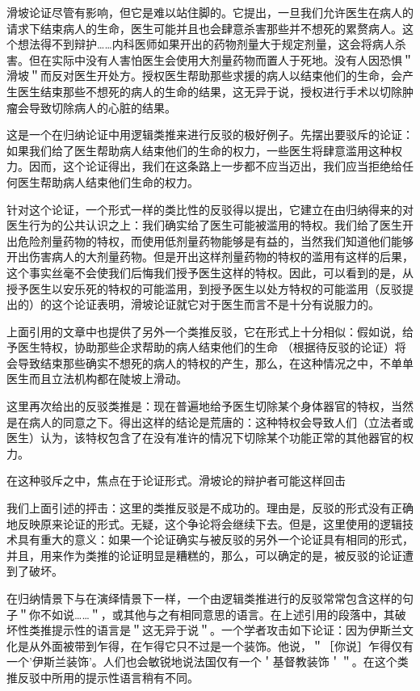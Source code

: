 滑坡论证尽管有影响，但它是难以站住脚的。它提出，一旦我们允许医生在病人的请求下结束病人的生命，医生可能并且也会肆意杀害那些并不想死的累赘病人。这个想法得不到辩护……内科医师如果开出的药物剂量大于规定剂量，这会将病人杀害。但在实际中没有人害怕医生会使用大剂量药物而置人于死地。没有人因恐惧＂滑坡＂而反对医生开处方。授权医生帮助那些求援的病人以结束他们的生命，会产生医生结束那些不想死的病人的生命的结果，这无异于说，授权进行手术以切除肿瘤会导致切除病人的心脏的结果。\cite{rachels1991}

这是一个在归纳论证中用逻辑类推来进行反驳的极好例子。先摆出要驳斥的论证：如果我们给了医生帮助病人结束他们的生命的权力，一些医生将肆意滥用这种权力。因而，这个论证得出，我们在这条路上一步都不应当迈出，我们应当拒绝给任何医生帮助病人结束他们生命的权力。

针对这个论证，一个形式一样的类比性的反驳得以提出，它建立在由归纳得来的对医生行为的公共认识之上：我们确实给了医生可能被滥用的特权。我们给了医生开出危险剂量药物的特权，而使用低剂量药物能够是有益的，当然我们知道他们能够开出伤害病人的大剂量药物。但是开出这样剂量药物的特权的滥用有这样的后果，这个事实丝毫不会使我们后悔我们授予医生这样的特权。因此，可以看到的是，从授予医生以安乐死的特权的可能滥用，到授予医生以处方特权的可能滥用（反驳提出的）的这个论证表明，滑坡论证就它对于医生而言不是十分有说服力的。

上面引用的文章中也提供了另外一个类推反驳，它在形式上十分相似：假如说，给予医生特权，协助那些企求帮助的病人结束他们的生命 （根据待反驳的论证）将会导致结束那些确实不想死的病人的特权的产生，那么，在这种情况之中，不单单医生而且立法机构都在陡坡上滑动。

这里再次给出的反驳类推是：现在普遍地给予医生切除某个身体器官的特权，当然是在病人的同意之下。得出这样的结论是荒唐的：这种特权会导致人们（立法者或医生）认为，该特权包含了在没有准许的情况下切除某个功能正常的其他器官的权力。

在这种驳斥之中，焦点在于论证形式。滑坡论的辩护者可能这样回击

我们上面引述的抨击：这里的类推反驳是不成功的。理由是，反驳的形式没有正确地反映原来论证的形式。无疑，这个争论将会继续下去。但是，这里使用的逻辑技术具有重大的意义：如果一个论证确实与被反驳的另外一个论证具有相同的形式，并且，用来作为类推的论证明显是糟糕的，那么，可以确定的是，被反驳的论证遭到了破坏。

在归纳情景下与在演绎情景下一样，一个由逻辑类推进行的反驳常常包含这样的句子＂你不如说……＂，或其他与之有相同意思的语言。在上述引用的段落中，其破坏性类推提示性的语言是＂这无异于说＂。一个学者攻击如下论证：因为伊斯兰文化是从外面被带到乍得，在乍得它只不过是一个装饰。他说，＂［你说］乍得仅有一个'伊斯兰装饰'。人们也会敏锐地说法国仅有一个＇基督教装饰＇＂\cite{brenner1993}。在这个类推反驳中所用的提示性语言稍有不同。


